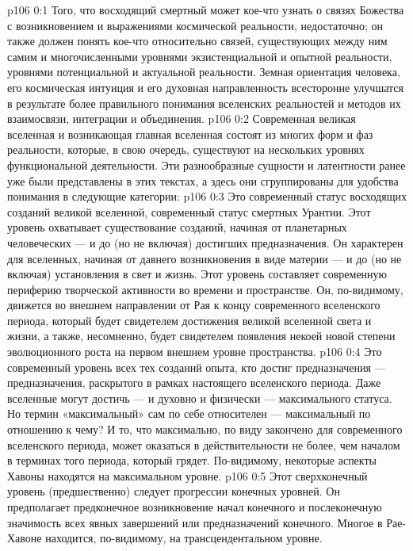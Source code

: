 \author{Мелхиседек}
\vs p106 0:1 Того, что восходящий смертный может кое\hyp{}что узнать о связях Божества с возникновением и выражениями космической реальности, недостаточно; он также должен понять кое\hyp{}что относительно связей, существующих между ним самим и многочисленными уровнями экзистенциальной и опытной реальности, уровнями потенциальной и актуальной реальности. Земная ориентация человека, его космическая интуиция и его духовная направленность всесторонне улучшатся в результате более правильного понимания вселенских реальностей и методов их взаимосвязи, интеграции и объединения.
\vs p106 0:2 Современная великая вселенная и возникающая главная вселенная состоят из многих форм и фаз реальности, которые, в свою очередь, существуют на нескольких уровнях функциональной деятельности. Эти разнообразные сущности и латентности ранее уже были представлены в этих текстах, а здесь они сгруппированы для удобства понимания в следующие категории:
\vs p106 0:3 \bibnobreakspace {} Это современный статус восходящих созданий великой вселенной, современный статус смертных Урантии. Этот уровень охватывает существование созданий, начиная от планетарных человеческих --- и до (но не включая) достигших предназначения. Он характерен для вселенных, начиная от давнего возникновения в виде материи --- и до (но не включая) установления в свет и жизнь. Этот уровень составляет современную периферию творческой активности во времени и пространстве. Он, по\hyp{}видимому, движется во внешнем направлении от Рая к концу современного вселенского периода, который будет свидетелем достижения великой вселенной света и жизни, а также, несомненно, будет свидетелем появления некоей новой степени эволюционного роста на первом внешнем уровне пространства.
\vs p106 0:4 \pc {}\bibnobreakspace {} Это современный уровень всех тех созданий опыта, кто достиг предназначения --- предназначения, раскрытого в рамках настоящего вселенского периода. Даже вселенные могут достичь --- и духовно и физически --- максимального статуса. Но термин «максимальный» сам по себе относителен --- максимальный по отношению к чему? И то, что максимально, по виду закончено для современного вселенского периода, может оказаться в действительности не более, чем началом в терминах того периода, который грядет. По\hyp{}видимому, некоторые аспекты Хавоны находятся на максимальном уровне.
\vs p106 0:5 \pc {}\bibnobreakspace {} Этот сверхконечный уровень (предшественно) следует прогрессии конечных уровней. Он предполагает предконечное возникновение начал конечного и послеконечную значимость всех явных завершений или предназначений конечного. Многое в Рае\hyp{}Хавоне находится, по\hyp{}видимому, на трансцендентальном уровне.
